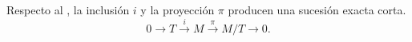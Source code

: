 \begin{ejemplo}
	Respecto al , la inclusión \(i\) y la proyección \(\pi\) producen
	una sucesión exacta corta.
	\[
	0 \rightarrow T \xrightarrow{i}M \xrightarrow{\pi}M/T \rightarrow 0.
	\]
\end{ejemplo}
%
%
%
%
